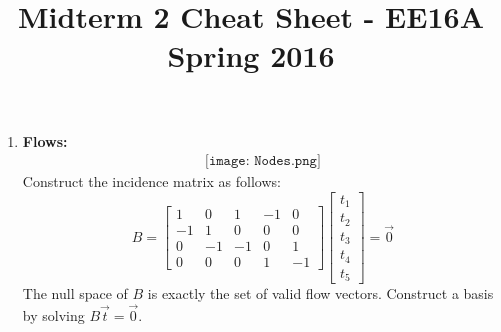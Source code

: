 \documentclass[10pt]{article}
\begin{document}
\date{}
\title{\vspace{-5ex}Midterm 2 Cheat Sheet - EE16A Spring 2016\vspace{-5ex}}
\maketitle
\begin{multicols}{2}
\begin{enumerate}
    \item \textbf{Flows:} 
    \begin{align*}
        \texttt{[image: Nodes.png]}
     \end{align*}
    Construct the incidence matrix as follows:
    \begin{equation*}
        B=\begin{bmatrix} 
        1 & 0 & 1 & -1 & 0 \\
        -1 & 1 & 0 & 0 & 0 \\
        0 & -1 & -1 & 0 & 1 \\
        0 & 0 & 0 & 1 & -1
        \end{bmatrix}
        \begin{bmatrix} t_1 \\ t_2 \\ t_3 \\ t_4 \\ t_5 \end{bmatrix}=\vec{0}
    \end{equation*}
    The null space of $B$ is exactly the set of valid flow vectors. Construct a basis by solving $B\vec{t}=\vec{0}$.
    

\end{enumerate}
\end{multicols}
\end{document}
